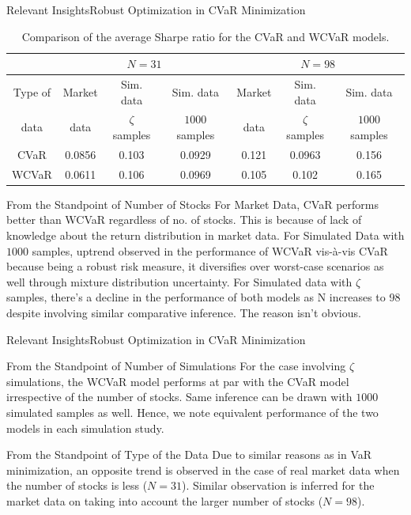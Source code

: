 \documentclass{beamer}
\begin{document}
\begin{frame}{Relevant Insights}{Robust Optimization in CVaR Minimization}
\begin{table}[!h]
  \centering
  \tiny
    \captionsetup{justification=centering}
  \begin{tabular}{|c|c|c|c|c|c|c|}
    \hline
   \multirow{2}{*}{} $N$ &
      \multicolumn{3}{c|}{$N=31$} &
      \multicolumn{3}{c|}{$N=98$}  \\
    \hline
    Type of & Market & Sim. data & Sim. data & Market & Sim. data & Sim. data \\
    data & data & $\zeta$ samples & $1000$ samples & data & $\zeta$ samples & $1000$ samples \\
    \hline
    CVaR & 0.0856 & 0.103 & 0.0929 & 0.121 & 0.0963 & 0.156 \\
    \hline
    WCVaR & 0.0611 & 0.106 & 0.0969 & 0.105 & 0.102 & 0.165 \\
    \hline
  \end{tabular}
  \caption{Comparison of the average Sharpe ratio for the CVaR and WCVaR models.}
  \label{tab:cvar_conc}
\end{table}

\begin{block}{From the Standpoint of Number of Stocks}
For Market Data, CVaR performs better than WCVaR regardless of no. of stocks. This is because of lack of knowledge about the return distribution in market data. For Simulated Data with $1000$ samples, uptrend observed in the performance of WCVaR vis-\`a-vis CVaR because being a robust risk measure, it diversifies over worst-case scenarios as well through mixture distribution uncertainty. For Simulated data with $\zeta$ samples, there's a decline in the performance of both models as N increases to 98 despite involving similar comparative inference. The reason isn't obvious.
    

\end{block}

\end{frame}

\begin{frame}{Relevant Insights}{Robust Optimization in CVaR Minimization}

\begin{block}{From the Standpoint of Number of Simulations}
For the case involving $\zeta$ simulations, the WCVaR model performs at par with the CVaR model irrespective of the number of stocks. Same inference can be drawn with $1000$ simulated samples as well. Hence, we note equivalent performance of the two models in each simulation study.
\end{block}

\begin{block}{From the Standpoint of Type of the Data}
Due to similar reasons as in VaR minimization, an opposite trend is observed in the case of real market data when the number of stocks is less ($N=31$). Similar observation is inferred for the market data on taking into account the larger number of stocks ($N=98$). 
\end{block}

\end{frame}
\end{document}
